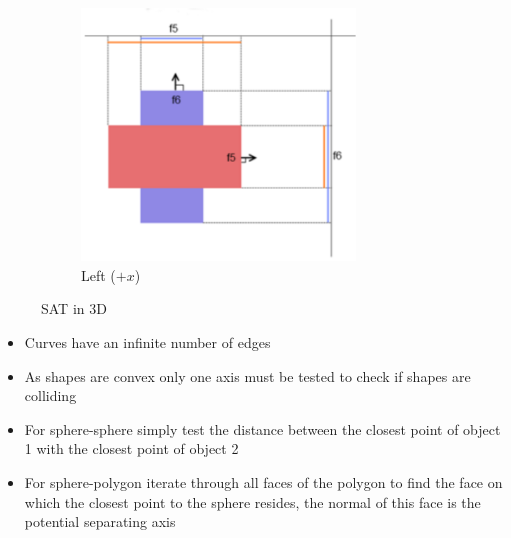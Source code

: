 \documentclass[a4paper]{article}
\begin{document}
\begin{figure}[h]
\begin{subfigure}[b]{0.32\textwidth}
    \includegraphics[width=0.8\textwidth]{graphics/colldet_sat_3d_left.eps}
    \caption{Left ($+x$)}
  \end{subfigure}

  \caption{SAT in 3D}
  \label{fig:colldet_sat_3d}
\end{figure}
\FloatBarrier


\begin{itemize}
  \item
    Curves have an infinite number of edges

  \item
    As shapes are convex only one axis must be tested to check if shapes are
    colliding

  \item
    For sphere-sphere simply test the distance between the closest point of
    object 1 with the closest point of object 2

  \item
    For sphere-polygon iterate through all faces of the polygon to find the face
    on which the closest point to the sphere resides, the normal of this face is
    the potential separating axis

\end{itemize}
\end{document}
